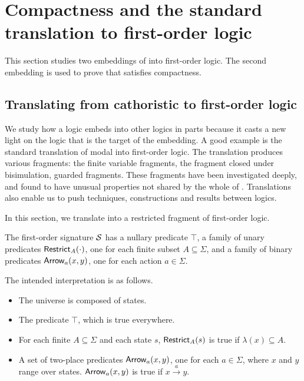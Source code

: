 \section{Compactness and the standard translation to first-order logic }
\label{compactness}

This section studies two embeddings of \cathoristic{} into first-order
logic. The second embedding is used to prove that \cathoristic{} satisfies compactness.

\subsection{Translating from  cathoristic to
            first-order logic}\label{standardTranslation}

We study how a logic embeds into other logics in parts because it
casts a new light on the logic that is the target of the embedding.  A
good example is the standard translation of modal into first-order
logic.  The translation produces various fragments: the finite
variable fragments, the fragment closed under bisimulation, 
guarded fragments.  These fragments have been investigated deeply, and
found to have unusual properties not shared by the whole of \fol.
Translations also enable us to push techniques, constructions and
results between logics.

%

In this section, we translate \cathoristic{} into a restricted fragment of
first-order logic.

\begin{definition}
The first-order signature $\mathcal{S}$ has a nullary predicate $\top$, a
family of unary predicates $\mathsf{Restrict}_{A}(\cdot)$, one for each finite
subset $A \subseteq \Sigma$, and a family of binary predicates
$\mathsf{Arrow}_{a}(x, y)$, one for each action $a \in \Sigma$. 

\end{definition}

\NI The intended interpretation is as follows.

\begin{itemize}

\item The universe is composed of states.

\item The predicate $\top$, which is true everywhere.

\item For each finite $A \subseteq \Sigma$ and each state $s$,  $\mathsf{Restrict}_{A}(s)$
is true if 
  $\lambda(x) \subseteq A$.

\item A set of two-place predicates $\mathsf{Arrow}_{a}(x, y)$, one for each $a
  \in \Sigma$, where $x$ and $y$ range over states. $\mathsf{Arrow}_{a}(x, y)$
  is true if $x \xrightarrow{a} y$.


\end{itemize}

